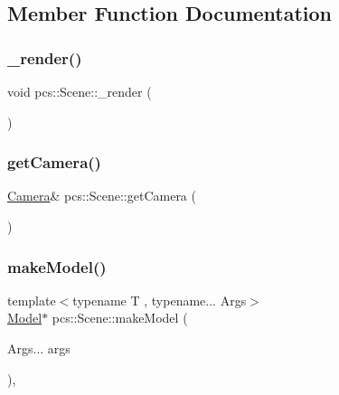 \subsection{Member Function Documentation}
\mbox{\label{classpcs_1_1Scene_ad5f0807caa705da2b3782ad4cf2619a8}} 
\subsubsection{\texorpdfstring{\+\_\+render()}{\_render()}}
{\footnotesize\ttfamily void pcs\+::\+Scene\+::\+\_\+render (\begin{DoxyParamCaption}{ }\end{DoxyParamCaption})\hspace{0.3cm}{\ttfamily [private]}}

\mbox{\label{classpcs_1_1Scene_a94be9eaa37239c5c0a854af148cf0225}} 
\subsubsection{\texorpdfstring{get\+Camera()}{getCamera()}}
{\footnotesize\ttfamily \hyperlink{classpcs_1_1Camera}{Camera}\& pcs\+::\+Scene\+::get\+Camera (\begin{DoxyParamCaption}{ }\end{DoxyParamCaption})\hspace{0.3cm}{\ttfamily [inline]}}

\mbox{\label{classpcs_1_1Scene_ad1e0224b21e0ab5a4bf24e91910f5ff0}} 
\subsubsection{\texorpdfstring{make\+Model()}{makeModel()}}
{\footnotesize\ttfamily template$<$typename T , typename... Args$>$ \\
\hyperlink{classpcs_1_1Model}{Model}$\ast$ pcs\+::\+Scene\+::make\+Model (\begin{DoxyParamCaption}\item[{Args...}]{args }\end{DoxyParamCaption})\hspace{0.3cm}{\ttfamily [inline]}, {\ttfamily [protected]}}

